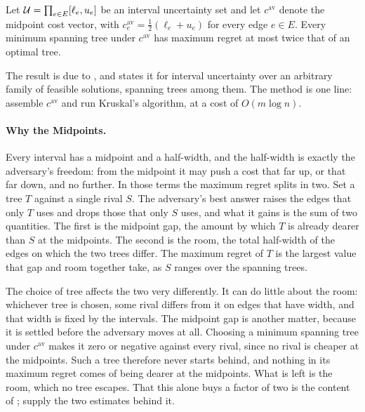 \begin{theorem}\label{thm:regret-2approx}
Let $\mathcal{U} = \prod_{e \in E} [\ell_e, u_e]$ be an interval uncertainty set and let $c^{\mathrm{av}}$ denote the midpoint cost vector, with $c^{\mathrm{av}}_e = \tfrac{1}{2}(\ell_e + u_e)$ for every edge $e \in E$.
Every minimum spanning tree under $c^{\mathrm{av}}$ has maximum regret at most twice that of an optimal tree.
\end{theorem}

The result is due to \textcite{KasperskiZielinski2006}, and \cite[Theorem~5.26]{Goerigk2021RCO} states it for interval uncertainty over an arbitrary family of feasible solutions, spanning trees among them.
The method is one line: assemble $c^{\mathrm{av}}$ and run Kruskal's algorithm, at a cost of $O(m \log n)$.

\paragraph{Why the Midpoints.}

Every interval has a midpoint and a half-width, and the half-width is exactly the adversary's freedom: from the midpoint it may push a cost that far up, or that far down, and no further.
In those terms the maximum regret splits in two.
Set a tree $T$ against a single rival $S$.
The adversary's best answer raises the edges that only $T$ uses and drops those that only $S$ uses, and what it gains is the sum of two quantities.
The first is the midpoint gap, the amount by which $T$ is already dearer than $S$ at the midpoints.
The second is the room, the total half-width of the edges on which the two trees differ.
The maximum regret of $T$ is the largest value that gap and room together take, as $S$ ranges over the spanning trees.

The choice of tree affects the two very differently.
It can do little about the room: whichever tree is chosen, some rival differs from it on edges that have width, and that width is fixed by the intervals.
The midpoint gap is another matter, because it is settled before the adversary moves at all.
Choosing a minimum spanning tree under $c^{\mathrm{av}}$ makes it zero or negative against every rival, since no rival is cheaper at the midpoints.
Such a tree therefore never starts behind, and nothing in its maximum regret comes of being dearer at the midpoints.
What is left is the room, which no tree escapes.
That this alone buys a factor of two is the content of ; \cite[Lemmas~5.24 and~5.25]{Goerigk2021RCO} supply the two estimates behind it.

